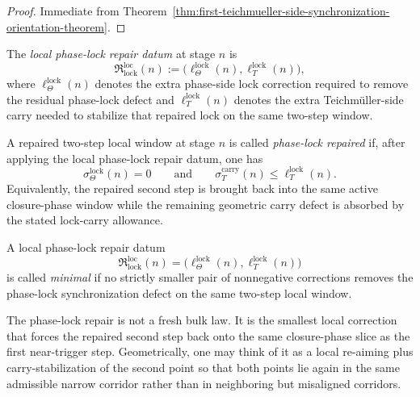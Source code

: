 \begin{proof}
Immediate from Theorem~\ref{thm:first-teichmueller-side-synchronization-orientation-theorem}.
\end{proof}



\begin{definition}
\label{def:local-phase-lock-repair-datum}
The \emph{local phase-lock repair datum} at stage $n$ is
\[
  \mathfrak R_{\mathrm{lock}}^{\mathrm{loc}}(n)
  :=
  \bigl(
    \ell_{\Theta}^{\mathrm{lock}}(n),
    \ell_{T}^{\mathrm{lock}}(n)
  \bigr),
\]
where $\ell_{\Theta}^{\mathrm{lock}}(n)$ denotes the extra phase-side lock correction required to remove the residual phase-lock defect and $\ell_{T}^{\mathrm{lock}}(n)$ denotes the extra Teichm\"uller-side carry needed to stabilize that repaired lock on the same two-step window.
\end{definition}

\begin{definition}
\label{def:phase-lock-repaired-local-window}
A repaired two-step local window at stage $n$ is called \emph{phase-lock repaired} if, after applying the local phase-lock repair datum, one has
\[
  \sigma_{\Theta}^{\mathrm{lock}}(n)=0
  \qquad\text{and}\qquad
  \sigma_T^{\mathrm{carry}}(n)\le \ell_T^{\mathrm{lock}}(n).
\]
Equivalently, the repaired second step is brought back into the same active closure-phase window while the remaining geometric carry defect is absorbed by the stated lock-carry allowance.
\end{definition}

\begin{definition}
\label{def:minimal-local-phase-lock-repair}
A local phase-lock repair datum
\[
  \mathfrak R_{\mathrm{lock}}^{\mathrm{loc}}(n)
  =
  \bigl(
    \ell_{\Theta}^{\mathrm{lock}}(n),
    \ell_{T}^{\mathrm{lock}}(n)
  \bigr)
\]
is called \emph{minimal} if no strictly smaller pair of nonnegative corrections removes the phase-lock synchronization defect on the same two-step local window.
\end{definition}

\begin{remark}
\label{rem:what-the-phase-lock-repair-really-does}
The phase-lock repair is not a fresh bulk law. It is the smallest local correction that forces the repaired second step back onto the same closure-phase slice as the first near-trigger step. Geometrically, one may think of it as a local re-aiming plus carry-stabilization of the second point so that both points lie again in the same admissible narrow corridor rather than in neighboring but misaligned corridors.
\end{remark}

